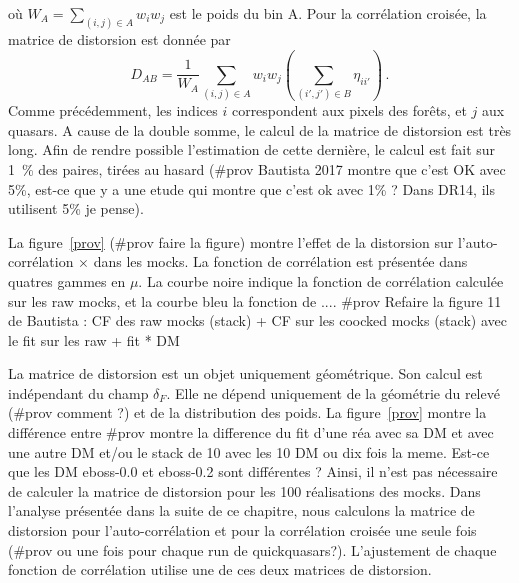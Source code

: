 \documentclass[11pt, twoside, a4paper, openright]{report}
\begin{document}
où $W_{A} = \sum_{(i,j)\in A} w_i w_j$ est le poids du bin A. Pour la corrélation croisée, la matrice de distorsion est donnée par
\begin{equation}
  \label{eq:xdmat}
  D_{AB} = \frac{1}{W_A} \sum_{(i,j)\in A} w_i w_j \left( \sum_{(i',j')\in B} \eta_{ii'} \right) \, .
\end{equation}
Comme précédemment, les indices $i$ correspondent aux pixels des forêts, et $j$ aux quasars. A cause de la double somme, le calcul de la matrice de distorsion est très long. Afin de rendre possible l'estimation de cette dernière, le calcul est fait sur \SI{1}{\percent} des paires, tirées au hasard (\#prov Bautista 2017 montre que c'est OK avec 5\%, est-ce que y a une etude qui montre que c'est ok avec 1\% ? Dans DR14, ils utilisent 5\% je pense).

La figure~\ref{prov} (\#prov faire la figure) montre l'effet de la distorsion sur l'auto-corrélation \lya{}$\times$\lya{} dans les mocks. La fonction de corrélation est présentée dans quatres gammes en $\mu$. La courbe noire indique la fonction de corrélation calculée sur les raw mocks, et la courbe bleu la fonction de ....
\#prov Refaire la figure 11 de Bautista : CF des raw mocks (stack) + CF sur les coocked mocks (stack) avec le fit sur les raw + fit * DM


La matrice de distorsion est un objet uniquement géométrique. Son calcul est indépendant du champ $\delta_F$. Elle ne dépend uniquement de la géométrie du relevé (\#prov comment ?) et de la distribution des poids.
La figure~\ref{prov} montre la différence entre \#prov montre la difference du fit d'une réa avec sa DM et avec une autre DM et/ou le stack de 10 avec les 10 DM ou dix fois la meme. Est-ce que les DM eboss-0.0 et eboss-0.2 sont différentes ?
Ainsi, il n'est pas nécessaire de calculer la matrice de distorsion pour les 100 réalisations des mocks.
Dans l'analyse présentée dans la suite de ce chapitre, nous calculons la matrice de distorsion pour l'auto-corrélation et pour la corrélation croisée une seule fois (\#prov ou une fois pour chaque run de quickquasars?). L'ajustement de chaque fonction de corrélation utilise une de ces deux matrices de distorsion.
\end{document}
